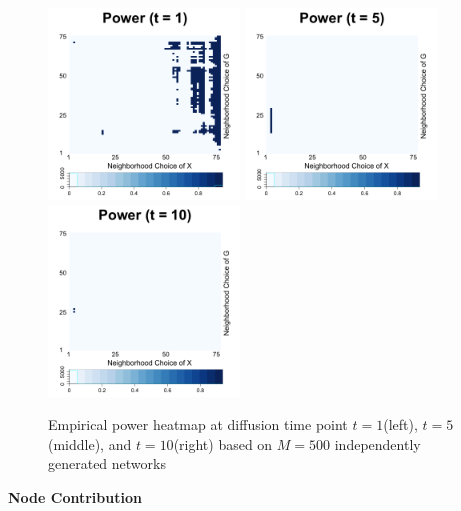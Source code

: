 \documentclass[12pt]{article}
\theoremstyle{definition}
\begin{document}
\begin{figure}[H]
	\centering
	\includegraphics[width=2in]{../Figure/gaus_power1.png}
	\includegraphics[width=2in]{../Figure/gaus_power5.png}
	\includegraphics[width=2in]{../Figure/gaus_power10.png}
	\caption{Empirical power heatmap at diffusion time point $t=1$(left), $t=5$(middle), and $t=10$(right) based on $M = 500$ independently generated networks}
\end{figure}





\textbf{Node Contribution}
\end{document}
